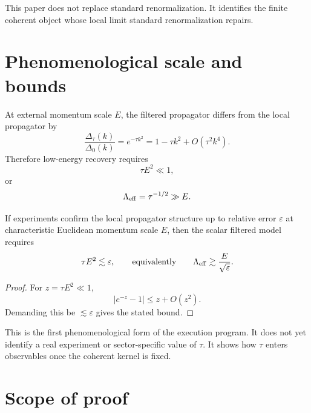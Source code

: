 \documentclass[11pt]{article}
\begin{document}
\begin{remark}
This paper does not replace standard renormalization. It identifies the finite coherent object whose local limit standard renormalization repairs.
\end{remark}

\section{Phenomenological scale and bounds}

At external momentum scale \(E\), the filtered propagator differs from the local propagator by
\[
\frac{\Delta_\tau(k)}{\Delta_0(k)}
=
e^{-\tau k^2}
=
1-\tau k^2+O(\tau^2 k^4).
\]
Therefore low-energy recovery requires
\[
\tau E^2\ll1,
\]
or
\[
\Lambda_{\rm eff}=\tau^{-1/2}\gg E.
\]

\begin{proposition}
If experiments confirm the local propagator structure up to relative error \(\varepsilon\) at characteristic Euclidean momentum scale \(E\), then the scalar filtered model requires
\[
\tau E^2\lesssim \varepsilon,
\qquad
\text{equivalently}\qquad
\Lambda_{\rm eff}\gtrsim \frac{E}{\sqrt{\varepsilon}}.
\]
\end{proposition}

\begin{proof}
For \(z=\tau E^2\ll1\),
\[
|e^{-z}-1|\le z+O(z^2).
\]
Demanding this be \(\lesssim\varepsilon\) gives the stated bound.
\end{proof}

\begin{remark}
This is the first phenomenological form of the execution program. It does not yet identify a real experiment or sector-specific value of \(\tau\). It shows how \(\tau\) enters observables once the coherent kernel is fixed.
\end{remark}

\section{Scope of proof}
\end{document}
